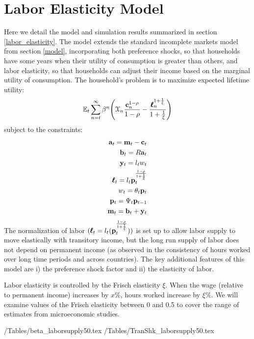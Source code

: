 \documentclass[titlepage]{\econtex}\newcommand{\texname}{ConsumptionHeterogeneity}
\begin{document}
\section{Labor Elasticity Model} \label{labor_elasticity_model}
\setcounter{figure}{0}   
\setcounter{table}{0} 
Here we detail the model and simulation results summarized in section \ref{labor_elasticity}. The model extends the standard incomplete markets model from section \ref{model}, incorporating both preference shocks, so that households have some years when their utility of consumption is greater than others, and labor elasticity, so that households can adjust their income based on the marginal utility of consumption. The household's problem is to maximize expected lifetime utility:
\begin{align*}
\mathbb{E}_t \sum_{n=t}^{\infty} \beta^n \Bigg(\mathcal{X}_n \frac{ \mathbf{c}_n^{1-\rho}}{1-\rho}-\frac{\pmb{\ell}_n^{1+\frac{1}{\xi}}}{1+\frac{1}{\xi}} \Bigg)
\end{align*}
subject to the constraints:
\begin{align*}
\mathbf{a}_t = \mathbf{m}_t - \mathbf{c}_t \\
\mathbf{b}_t = R\mathbf{a}_t \\
\mathbf{y}_t =  l_t w_t \\
\pmb{\ell}_t = l_t \mathbf{p}_t^{\frac{1-\rho}{1+\frac{1}{\xi}}}\\
w_t = \theta_t \mathbf{p}_t \\
\mathbf{p}_t = \Psi_t \mathbf{p}_{t-1} \\
\mathbf{m}_t = \mathbf{b}_t + \mathbf{y}_t
\end{align*}
The normalization of labor $(\pmb{\ell}_t = l_t (\mathbf{p}_t^{\frac{1-\rho}{1+\frac{1}{\xi}}}))$ is set up to allow labor supply to move elastically with transitory income, but the long run supply of labor does not depend on permanent income (as observed in the consistency of hours worked over long time periods and across countries). The key additional features of this model are i) the preference shock factor and ii) the elasticity of labor.

Labor elasticity is controlled by the Frisch elasticity $\xi$. When the wage (relative to permanent income) increases by $x\%$, hours worked increase by $\xi\%$. We will examine values of the Frisch elasticity between 0 and 0.5 to cover the range of estimates from microeconomic studies.

\begin{center}
	\econtexRoot/Tables/beta_laborsupply50.tex	
	\econtexRoot/Tables/TranShk_laborsupply50.tex		
	\label{table:fitted_beta_and_transtd}
\end{center}
\end{document}
